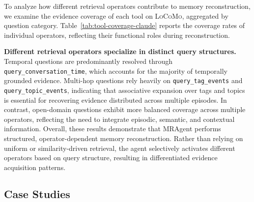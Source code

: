\documentclass{llmxive}
\begin{document}
To analyze how different retrieval operators contribute to memory reconstruction,
we examine the evidence coverage of each tool on \textsc{LoCoMo}, aggregated by question category.
Table~\ref{tab:tool-coverage-claude} reports the coverage rates of individual operators, reflecting their functional roles during reconstruction.

\textbf{Different retrieval operators specialize in distinct query structures.}
Temporal questions are predominantly resolved through \texttt{query\_conversation\_time}, which accounts for the majority of temporally grounded evidence.
Multi-hop questions rely heavily on \texttt{query\_tag\_events} and \texttt{query\_topic\_events}, indicating that associative expansion over tags and topics is essential for recovering evidence distributed across multiple episodes.
In contrast, open-domain questions exhibit more balanced coverage across multiple operators, reflecting the need to integrate episodic, semantic, and contextual information.
Overall, these results demonstrate that MRAgent performs structured, operator-dependent memory reconstruction.
Rather than relying on uniform or similarity-driven retrieval, the agent selectively activates different operators based on query structure, resulting in differentiated evidence acquisition patterns.




\subsection{Case Studies}
\label{app:case_study}


\end{document}
